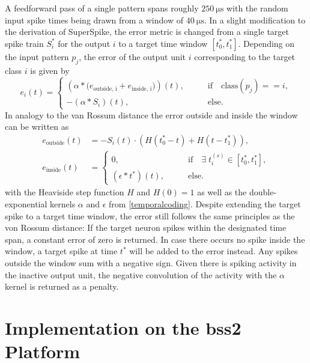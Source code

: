 A feedforward pass of a single pattern spans roughly $\SI{250}{\micro \s}$ with the random input spike times being drawn from a window of $\SI{40}{\micro \s}$. In a slight modification to the derivation of SuperSpike, the error metric is changed from a single target spike train $S_i^*$ for the output $i$ to a target time window $[t^*_0, t^*_1]$. Depending on the input pattern $p_j$, the error of the output unit $i$ corresponding to the target class $i$ is given by
\begin{equation}
e_i(t) = \begin{cases}
\left(\alpha \ast \big(e_\text{outside, i} + e_\text{inside, i}\big)\right)(t),& \quad \quad \text{if} \quad \text{class}(p_j) == i, \\
- (\alpha \ast S_i)(t)	,& \quad \quad \text{else}. 
\end{cases}
\label{superspikeerror}
\end{equation}
In analogy to the van Rossum distance the error outside and inside the window can be written as 
\begin{align*}
e_\text{outside}(t) &= - S_i(t) \cdot \left(H(t^*_0 - t) + H(t - t^*_1)\right), \\
e_\text{inside}(t) &= 
\begin{cases}
0 ,&\quad \quad \text{if} \quad \exists \; t^{(s)}_i \in [t^*_0, t^*_1], \\
(\epsilon \ast t^*)(t) ,& \quad \quad \text{else}.
\end{cases}
\end{align*}
with the Heaviside step function $H$ and $H(0) = 1$ as well as the double-exponential kernels $\alpha$ and $\epsilon$ from \cref{temporalcoding}.
Despite extending the target spike to a target time window, the error still follows the same principles as the von Rossum distance: If the target neuron spikes within the designated time span, a constant error of zero is returned. In case there occurs no spike inside the window, a target spike at time $t^*$ will be added to the error instead. Any spikes outside the window sum with a negative sign. Given there is spiking activity in the inactive output unit, the negative convolution of the activity with the $\alpha$ kernel is returned as a penalty.

\section{Implementation on the \acrshort{bss2} Platform}

